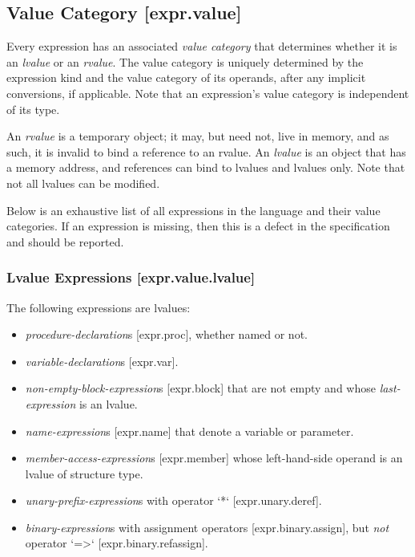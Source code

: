 \documentclass[a4paper, 12pt, oneside, final]{article}
\makeatletter
\def\section{\@startsection{section}{1}{0mm}{-3.5ex}{3.5ex}{\normalfont\fontsize{24pt}{36pt}\selectfont}}
\def\sref[#1]{[#1]}
\makeatother
\begin{document}
\section{Expressions [expr]}
\subsection{Value Category [expr.value]}
Every expression has an associated \emph{value category} that determines whether it is an \emph{lvalue} or an \emph{rvalue}. The
value category is uniquely determined by the expression kind and the value category of its operands, after any implicit
conversions, if applicable. Note that an expression’s value category is independent of its type.

An \emph{rvalue} is a temporary object; it may, but need not, live in memory, and as such,
it is invalid to bind a reference to an rvalue. An \emph{lvalue} is an object that has a memory address, and references
can bind to lvalues and lvalues only. Note that not all lvalues can be modified.

Below is an exhaustive list of all expressions in the language and their value categories. If an expression is missing, then
this is a defect in the specification and should be reported.

\subsubsection{Lvalue Expressions [expr.value.lvalue]}
The following expressions are lvalues:
\begin{itemize}
\item \emph{procedure-declaration}s \sref[expr.proc], whether named or not.
\item \emph{variable-declaration}s \sref[expr.var].
\item \emph{non-empty-block-expression}s \sref[expr.block] that are not empty and whose \emph{last-expression} is an lvalue.
\item \emph{name-expression}s \sref[expr.name] that denote a variable or parameter.
\item \emph{member-access-expression}s \sref[expr.member] whose left-hand-side operand is an lvalue of structure type.
\item \emph{unary-prefix-expression}s with operator `*` \sref[expr.unary.deref].
\item \emph{binary-expression}s with assignment operators \sref[expr.binary.assign], but \emph{not} operator `=>` \sref[expr.binary.refassign].
\end{itemize}
\end{document}
